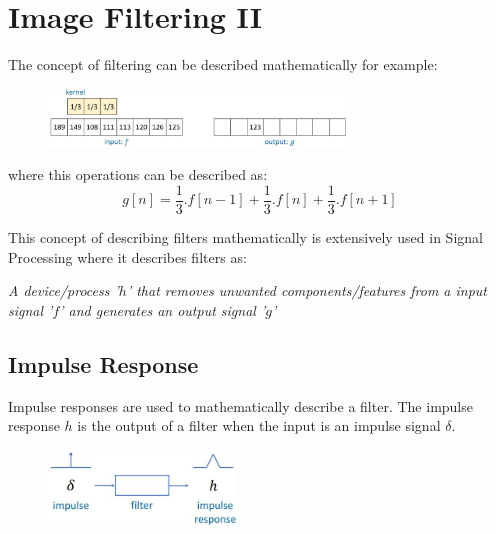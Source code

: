 \documentclass{report}
\begin{document}
\chapter{Image Filtering II}

The concept of filtering can be described mathematically for example: 
\begin{figure}[h]
    \centering
    \includegraphics[width=8cm]{Filter_mathematical_example 1.JPG}
\end{figure}
where this operations can be described as:
$$
    g[n] = \frac{1}{3} . f[n-1] + \frac{1}{3} . f[n] + \frac{1}{3} . f[n+1]
$$

This concept of describing filters mathematically is extensively used in Signal
Processing where it describes filters as:
\begin{center}
    \textit{A device/process '$h$' that removes unwanted components/features from a input
    signal '$f$' and generates an output signal '$g$'}
\end{center}

\section*{Impulse Response}

Impulse responses are used to mathematically describe a filter. The impulse
response $h$ is the output of a filter when the input is an impulse signal $\delta$. 
\begin{figure}[h]
    \centering
    \includegraphics[width=5cm]{Impulse response.JPG}
\end{figure}
\end{document}

